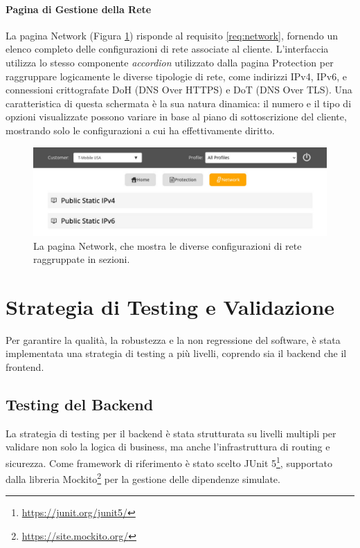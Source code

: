 \documentclass[12pt,a4paper,openright,twoside]{book}
\begin{document}
\FloatBarrier


\paragraph{Pagina di Gestione della Rete}
La pagina Network (Figura \ref{fig:network_page}) risponde al requisito \ref{req:network}, fornendo un elenco completo delle configurazioni di rete associate al cliente. L'interfaccia utilizza lo stesso componente \textit{accordion} utilizzato dalla pagina Protection per raggruppare logicamente le diverse tipologie di rete, come indirizzi IPv4, IPv6, e connessioni crittografate DoH (DNS Over HTTPS) e DoT (DNS Over TLS). Una caratteristica di questa schermata è la sua natura dinamica: il numero e il tipo di opzioni visualizzate possono variare in base al piano di sottoscrizione del cliente, mostrando solo le configurazioni a cui ha effettivamente diritto.

\begin{figure}[htbp]
    \centering
    \includegraphics[width=\textwidth]{figures/NETWORK.pdf}
    \caption{La pagina Network, che mostra le diverse configurazioni di rete raggruppate in sezioni.}
    \label{fig:network_page}
\end{figure}

\FloatBarrier

\section{Strategia di Testing e Validazione}
\label{sec:testing}
Per garantire la qualità, la robustezza e la non regressione del software, è stata implementata una strategia di testing a più livelli, coprendo sia il backend che il frontend.

\subsection{Testing del Backend}

La strategia di testing per il backend è stata strutturata su livelli multipli per validare non solo la logica di business, ma anche l'infrastruttura di routing e sicurezza. Come framework di riferimento è stato scelto JUnit 5\footnote{\url{https://junit.org/junit5/}}, supportato dalla libreria Mockito\footnote{\url{https://site.mockito.org/}} per la gestione delle dipendenze simulate.
\end{document}
